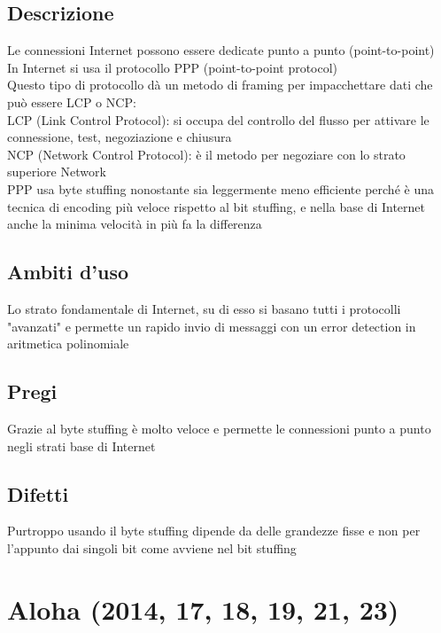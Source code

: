 \documentclass[10pt,oneside,a4paper]{article}
\begin{document}
\subsection{Descrizione}
Le connessioni Internet possono essere dedicate punto a punto (point-to-point)\\
In Internet si usa il protocollo PPP (point-to-point protocol)\\
Questo tipo di protocollo dà un metodo di framing per impacchettare dati che può essere LCP o NCP:\\
LCP (Link Control Protocol): si occupa del controllo del flusso per attivare le connessione, test, negoziazione e chiusura\\
NCP (Network Control Protocol): è il metodo per negoziare con lo strato superiore Network\\
PPP usa byte stuffing nonostante sia leggermente meno efficiente perché è una tecnica di encoding più veloce rispetto al bit stuffing, e nella base di Internet anche la minima velocità in più fa la differenza
\subsection{Ambiti d'uso}
Lo strato fondamentale di Internet, su di esso si basano tutti i protocolli "avanzati" e permette un rapido invio di messaggi con un error detection in aritmetica polinomiale
\subsection{Pregi}
Grazie al byte stuffing è molto veloce e permette le connessioni punto a punto negli strati base di Internet
\subsection{Difetti}
Purtroppo usando il byte stuffing dipende da delle grandezze fisse e non per l'appunto dai singoli bit come avviene nel bit stuffing
\section{Aloha (2014, 17, 18, 19, 21, 23)}
\end{document}
